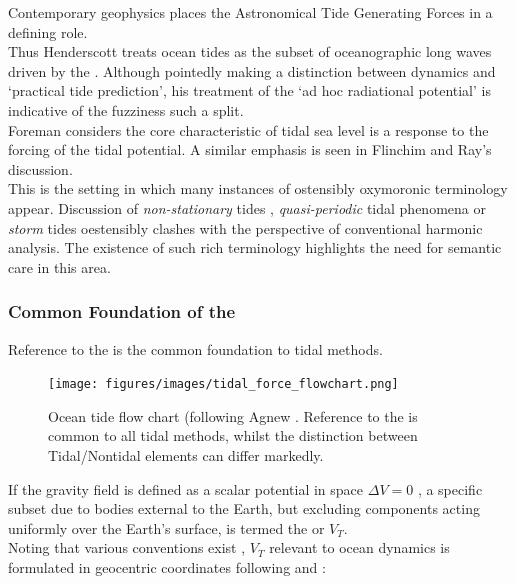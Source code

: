 Contemporary geophysics places the Astronomical Tide Generating Forces \ATGP{} in a defining role.\\
Thus Henderscott \cite{Hendershott:1981ub} treats ocean tides as the subset of oceanographic long waves driven by the \ATGP{}. 
Although pointedly making a distinction between dynamics and `practical tide prediction', his treatment of the `ad hoc radiational potential'\cite{Munk:1966ts} is indicative of the fuzziness such a split.\\
Foreman \cite{foreman:2012perscomm} considers the core characteristic of tidal sea level is a response to the forcing of the tidal potential.   A similar emphasis is seen in Flinchim and Ray's \citep{Flinchem:2000kp} discussion.\\


This is the setting in which many instances of ostensibly oxymoronic terminology appear.
Discussion of \emph{non-stationary} tides \cite{Ray:2011tj}, \emph{quasi-periodic} tidal phenomena \citep{Flinchem:2000kp} or \emph{storm} tides \cite{Horsburgh:2008gw} oestensibly clashes with the perspective of conventional harmonic analysis.  The existence of such rich terminology highlights the need for semantic care in this area.\\



\subsubsection{Common Foundation of the \ATGP{}}
Reference to the \ATGP{} is the common foundation to tidal methods.   

\begin{figure}[h]
\begin{center}
\texttt{[image: figures/images/tidal\_force\_flowchart.png]}
\caption{Ocean tide flow chart (following Agnew \citep{Agnew:2011ub}.  Reference to the \ATGP{} is common to all tidal methods, whilst the distinction between Tidal/Nontidal elements can differ markedly.}
\label{fig:TIDE_FORCE_FLOW}
\end{center}
\end{figure}


If the gravity field is defined as a scalar potential in space $\Delta V=0$ \citep[sec 5.3.1]{Urban:2013vl}, a specific subset due to bodies external to the Earth, but excluding components acting uniformly over the Earth's surface, is termed the \ATGP{} or $V_T$.\\
Noting that various conventions exist \citep[sec 6.5]{Anonymous:2004tm}, $V_T$ relevant to ocean dynamics is formulated in geocentric coordinates following \cite{Cartwright:1973em} and \cite{Desai:2006wo}:

